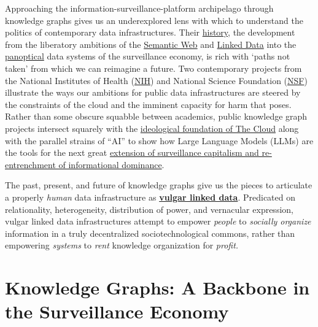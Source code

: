 Approaching the information-surveillance-platform archipelago through
knowledge graphs gives us an underexplored lens with which to understand
the politics of contemporary data infrastructures. Their
\protect\hyperlink{knowledge-graphs-a-backbone-in-the-surveillance-economy}{history},
the development from the liberatory ambitions of the
\protect\hyperlink{semantic-web-priesthoods}{Semantic Web} and
\protect\hyperlink{linked-data-platforms}{Linked Data} into the
\protect\hyperlink{knowledge-graphs-panoptica}{panoptical} data systems
of the surveillance economy, is rich with `paths not taken' from which
we can reimagine a future. Two contemporary projects from the National
Institutes of Health
(\protect\hyperlink{nih-the-biomedical-translator}{NIH}) and National
Science Foundation (\protect\hyperlink{nsf-open-knowledge-network}{NSF})
illustrate the ways our ambitions for public data infrastructures are
steered by the constraints of the cloud and the imminent capacity for
harm that poses. Rather than some obscure squabble between academics,
public knowledge graph projects intersect squarely with the
\protect\hyperlink{the-cloud-orthodoxy}{ideological foundation of The
Cloud} along with the parallel strains of ``AI'' to show how Large
Language Models (LLMs) are the tools for the next great
\protect\hyperlink{the-near-future-of-surveillance-capitalism-knowledge-graphs-get-chatbots}{extension
of surveillance capitalism and re-entrenchment of informational
dominance}.

The past, present, and future of knowledge graphs give us the pieces to
articulate a properly \emph{human} data infrastructure as
\protect\hyperlink{vulgar-linked-data}{\textbf{vulgar linked data}}.
Predicated on relationality, heterogeneity, distribution of power, and
vernacular expression, vulgar linked data infrastructures attempt to
empower \emph{people} to \emph{socially organize} information in a truly
decentralized sociotechnological commons, rather than empowering
\emph{systems} to \emph{rent} knowledge organization for \emph{profit.}

\hypertarget{knowledge-graphs-a-backbone-in-the-surveillance-economy}{%
\section{Knowledge Graphs: A Backbone in the Surveillance
Economy}\label{knowledge-graphs-a-backbone-in-the-surveillance-economy}}

